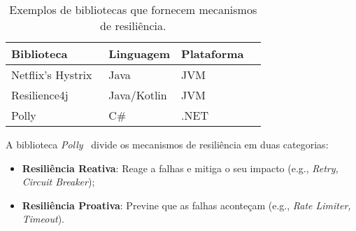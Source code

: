 \begin{table}[h]
    \centering
    \caption{Exemplos de bibliotecas que fornecem mecanismos de resiliência.}
    \label{tab:resilience_libraries}
    \begin{tabular}{|l|l|l|l|}
        \hline
        \textbf{Biblioteca}                      & \textbf{Linguagem} & \textbf{Plataforma} \\ \hline
        Netflix's Hystrix~\cite{netflix-hystrix} & Java               & JVM                 \\ \hline
        Resilience4j~\cite{resilience4j}         & Java/Kotlin        & JVM                 \\ \hline
        Polly ~\cite{polly-dotnet}               & C\#                & .NET                \\
        \hline
    \end{tabular}
\end{table}

A biblioteca \textit{Polly}~\cite{polly-dotnet} divide os mecanismos de resiliência em duas categorias:

\begin{itemize}[topsep=0pt,itemsep=0pt,partopsep=0pt, parsep=0pt]
    \item \textbf{Resiliência Reativa}: Reage a falhas e mitiga o seu impacto (e.g., \textit{Retry, Circuit Breaker});
    \item \textbf{Resiliência Proativa}: Previne que as falhas aconteçam (e.g., \textit{Rate Limiter, Timeout}).
\end{itemize}
